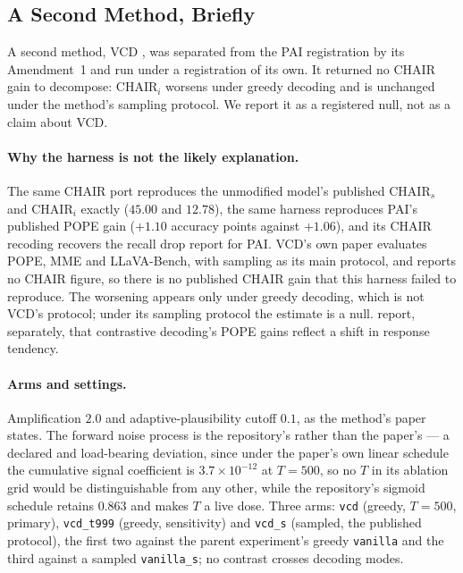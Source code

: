 \subsection{A Second Method, Briefly}
\label{app:mitig-vcd}

A second method, VCD \citep{vcd}, was separated from the PAI registration by its Amendment~1 and run
under a registration of its own. It returned no CHAIR gain to decompose: $\mathrm{CHAIR}_i$ worsens
under greedy decoding and is unchanged under the method's sampling protocol. We report it as a
registered null, not as a claim about VCD.

\paragraph{Why the harness is not the likely explanation.} The same CHAIR port reproduces the
unmodified model's published $\mathrm{CHAIR}_s$ and $\mathrm{CHAIR}_i$ exactly ($45.00$ and $12.78$),
the same harness reproduces PAI's published POPE gain ($+1.10$ accuracy points against $+1.06$), and its
CHAIR recoding recovers the recall drop \citet{sparc} report for PAI. VCD's own paper evaluates POPE,
MME and LLaVA-Bench, with sampling as its main protocol, and reports no CHAIR figure, so there is no
published CHAIR gain that this harness failed to reproduce. The worsening appears only under greedy
decoding, which is not VCD's protocol; under its sampling protocol the estimate is a null.
\citet{mirage} report, separately, that contrastive decoding's POPE gains reflect a shift in response
tendency.

\paragraph{Arms and settings.} Amplification $2.0$ and adaptive-plausibility cutoff $0.1$, as the
method's paper states. The forward noise process is the repository's rather than the paper's --- a
declared and load-bearing deviation, since under the paper's own linear schedule the cumulative
signal coefficient is $3.7\times 10^{-12}$ at $T=500$, so no $T$ in its ablation grid would be
distinguishable from any other, while the repository's sigmoid schedule retains $0.863$ and makes
$T$ a live dose. Three arms: \texttt{vcd} (greedy, $T=500$, primary), \texttt{vcd\_t999} (greedy,
sensitivity) and \texttt{vcd\_s} (sampled, the published protocol), the first two against the parent
experiment's greedy \texttt{vanilla} and the third against a sampled \texttt{vanilla\_s}; no contrast
crosses decoding modes.
